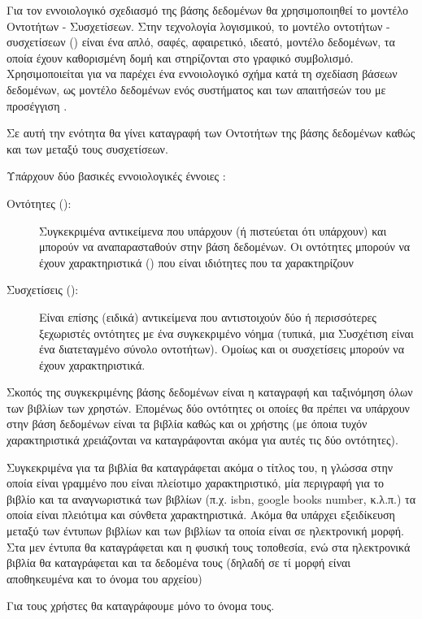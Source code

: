 \documentclass{assignment}
\begin{document}
Για τον εννοιολογικό σχεδιασμό της βάσης δεδομένων θα χρησιμοποιηθεί το μοντέλο Οντοτήτων - Συσχετίσεων.  Στην τεχνολογία λογισμικού, το μοντέλο οντοτήτων - συσχετίσεων () είναι ένα απλό, σαφές, αφαιρετικό, ιδεατό, μοντέλο δεδομένων, τα οποία έχουν καθορισμένη δομή και στηρίζονται στο γραφικό συμβολισμό. Χρησιμοποιείται για να παρέχει ένα εννοιολογικό σχήμα κατά τη σχεδίαση βάσεων δεδομένων, ως μοντέλο δεδομένων ενός συστήματος και των απαιτήσεών του με  προσέγγιση \cite{wiki:Entity_relationship_model, class_notes}.

Σε αυτή την ενότητα θα γίνει καταγραφή των Οντοτήτων της βάσης δεδομένων καθώς και των μεταξύ τους συσχετίσεων.

Υπάρχουν δύο βασικές εννοιολογικές έννοιες \cite{class_notes}:
\begin{description}
  \item[Οντότητες ():] Συγκεκριμένα αντικείμενα που υπάρχουν (ή πιστεύεται ότι υπάρχουν) και μπορούν να αναπαρασταθούν στην βάση δεδομένων. Οι οντότητες μπορούν να έχουν χαρακτηριστικά () που είναι ιδιότητες που τα χαρακτηρίζουν
  \item[Συσχετίσεις ():] Είναι επίσης (ειδικά) αντικείμενα που αντιστοιχούν δύο ή περισσότερες ξεχωριστές οντότητες με ένα συγκεκριμένο νόημα (τυπικά, μια Συσχέτιση είναι ένα διατεταγμένο σύνολο οντοτήτων). Ομοίως και οι συσχετίσεις μπορούν να έχουν χαρακτηριστικά.
\end{description}

Σκοπός της συγκεκριμένης βάσης δεδομένων είναι η καταγραφή και ταξινόμηση όλων των βιβλίων των χρηστών. Επομένως δύο οντότητες οι οποίες θα πρέπει να υπάρχουν στην βάση δεδομένων είναι τα βιβλία καθώς και οι χρήστης (με όποια τυχόν χαρακτηριστικά χρειάζονται να καταγράφονται ακόμα για αυτές τις δύο οντότητες).

Συγκεκριμένα για τα βιβλία θα καταγράφεται ακόμα ο τίτλος του, η γλώσσα στην οποία είναι γραμμένο που είναι πλείοτιμο χαρακτηριστικό, μία περιγραφή για το βιβλίο και τα αναγνωριστικά των βιβλίων (π.χ. isbn, google books number, κ.λ.π.) τα οποία είναι πλειότιμα και σύνθετα χαρακτηριστικά. Ακόμα θα υπάρχει εξειδίκευση μεταξύ των έντυπων βιβλίων και των βιβλίων τα οποία είναι σε ηλεκτρονική μορφή. Στα μεν έντυπα θα καταγράφεται και η φυσική τους τοποθεσία, ενώ στα ηλεκτρονικά βιβλία θα καταγράφεται και τα δεδομένα τους (δηλαδή σε τί μορφή είναι αποθηκευμένα και το όνομα του αρχείου)

Για τους χρήστες θα καταγράφουμε μόνο το όνομα τους.
\end{document}
